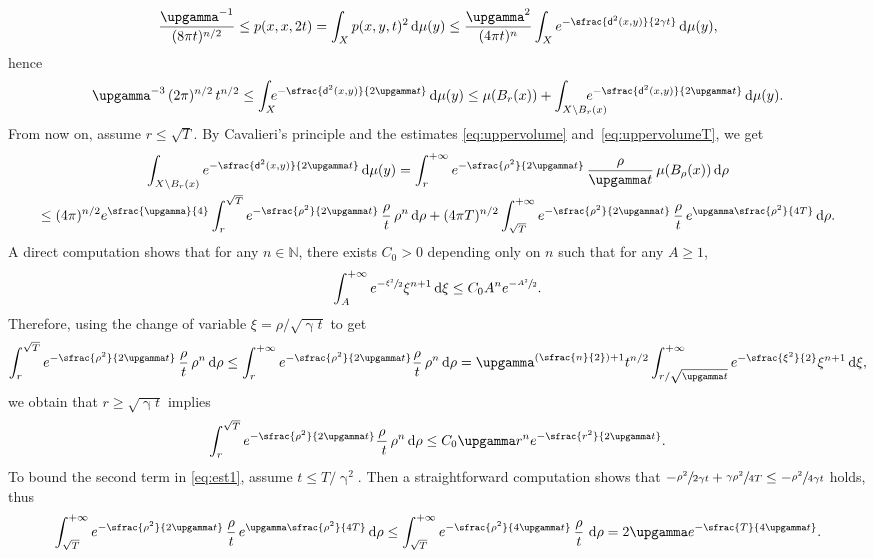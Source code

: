\documentclass[JEP,XML,SOM,Unicode,published]{cedram}
\newcommand{\Psfrac}[2]{(\sfrac{#1}{#2})}
\theoremstyle{plain}
\theoremstyle{definition}
\newcommand{\setN}{\mathbb{N}}
\newcommand{\di}{\mathop{}\!\mathrm{d}}
\newcommand{\dist}{\mathsf{d}}
\begin{document}
\[
\frac{\upgamma^{-1}}{(8\pi t)^{n/2}} \le p(x,x,2t) = \int_X p(x,y,t)^2 \di \mu(y) \le \frac{\upgamma^2}{(4 \pi t)^n} \int_X e^{-\sfrac{\dist^2(x,y)}{2 \gamma t}} \di \mu(y),
\]
hence
\begin{equation}\label{eq:est4}
\upgamma^{-3}\,(2\pi)^{n/2}\, t^{n/2} \le \int_X \hspace*{-2mm}e^{-\sfrac{\dist^2(x,y)}{2\upgamma t}}\di\mu(y) \le \mu(B_r(x))+\int_{X\setminus B_r(x)}\hspace*{-6mm} e^{-\sfrac{\dist^2(x,y)}{2\upgamma t}}\di\mu(y).
\end{equation}
From now on, assume $r \le \sqrt{T}$. By Cavalieri's principle and the estimates \eqref{eq:uppervolume} and~\eqref{eq:uppervolumeT}, we get
\begin{multline}\label{eq:est1}
\int_{X\setminus B_r(x)} e^{-\sfrac{\dist^2(x,y)}{2\upgamma t}}\di\mu(y)=\int_r^{+\infty} e^{-\sfrac{\rho^2}{2\upgamma t}}\,\frac{\rho}{\upgamma t}\,\mu(B_\rho(x))\di\rho\\
\le (4 \pi)^{n/2}e^{\sfrac{\upgamma}{4}} \int_r^{\sqrt{T}} e^{-\sfrac{\rho^2}{2\upgamma t}}\,\frac{\rho}{ t} \, \rho^n \di \rho+(4 \pi T)^{n/2}\int_{\sqrt{T}}^{+\infty} e^{-\sfrac{\rho^2}{2\upgamma t}}\,\frac{\rho}{ t}\, e^{\upgamma\sfrac{\rho^2}{4T}}\di\rho.
\end{multline}
A direct computation shows that for any $n \in \setN$, there exists $C_0>0$ depending only on $n$ such that for any $A\ge 1$,
\[
\int_A^{+\infty} e^{-\sfrac{\xi^2}{2}} \xi^{n+1} \di \xi \le C_0 A^n e^{-\sfrac{A^2}{2}}.
\]
Therefore, using the change of variable $\xi= \rho/\sqrt{\upgamma t}$ to get
\[
\int_r^{\sqrt{T}} e^{-\sfrac{\rho^2}{2\upgamma t}}\,\frac{\rho}{ t}\, \rho^n \di \rho\le \int_r^{+\infty} e^{-\sfrac{\rho^2}{2\upgamma t}}\frac{\rho}{ t}\, \rho^n \di\rho = \upgamma^{\Psfrac n2+1} t ^{n/2} \int_{r/\sqrt{\upgamma t}}^{+\infty} e^{-\sfrac{\xi^2}{2}}\xi^{n+1} \di \xi,
\]
we obtain that $r\ge \sqrt{\upgamma t}$ implies
\begin{equation}\label{eq:est2} \int_r^{\sqrt{T}} e^{-\sfrac{\rho^2}{2\upgamma t}}\frac{\rho}{\ t}\, \rho^n \di \rho\le C_0 \upgamma r^n e^{-\sfrac{r^2}{2\upgamma t}}.
\end{equation}
To bound the second term in \eqref{eq:est1}, assume $t\le T/\upgamma^2$. Then a straightforward computation shows that $-\sfrac{\rho^2}{2\gamma t} + \sfrac{\gamma \rho^2}{4T} \le - \sfrac{\rho^2}{4 \gamma t}$ holds, thus
\begin{equation}\label{eq:est3}
\int_{\sqrt{T}}^{+\infty} e^{-\sfrac{\rho^2}{2\upgamma t}}\,\frac{\rho}{ t}\, e^{\upgamma\sfrac{\rho^2}{4T}}\di \rho \le \int_{\sqrt{T}}^{+\infty} e^{-\sfrac{\rho^2}{4\upgamma t}}\,\frac{\rho}{ t}\, \di \rho = 2\upgamma e^{-\sfrac{T}{4\upgamma t}}.
\end{equation}
\end{document}
